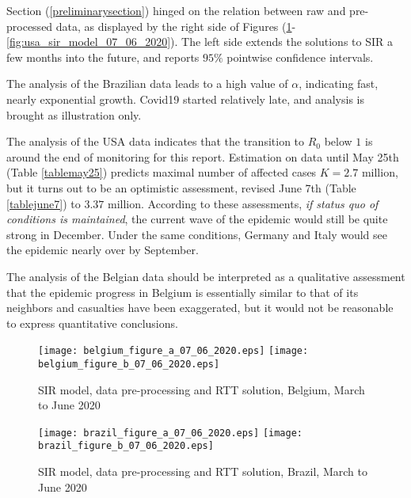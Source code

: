\documentclass{article}
\begin{document}
Section (\ref{preliminarysection}) hinged on the relation between raw and pre-processed data, as displayed by the right side of Figures  %
(\ref{fig:belgium_sir_model_07_06_2020}-\ref{fig:usa_sir_model_07_06_2020}). The left side extends the solutions to SIR a few months into the future, and reports $95\%$ pointwise confidence intervals.

The analysis of the Brazilian data leads to a high value of $\alpha$, indicating fast, nearly exponential growth. Covid19 started relatively late, and analysis is brought as illustration only.

The analysis of the USA data indicates that the transition to $R_0$ below $1$ is around the end of monitoring for this report. Estimation on data until May 25th (Table \ref{tablemay25}) predicts maximal number of affected cases $K=2.7$ million, but it turns out to be an optimistic assessment, revised June 7th (Table \ref{tablejune7}) to $3.37$ million. According to these assessments, {\em if status quo of conditions is maintained}, the current wave of the epidemic would still be quite strong in December. Under the same conditions, Germany and Italy would see the epidemic nearly over by September.

The analysis of the Belgian data should be interpreted as a qualitative assessment that the epidemic progress in Belgium is essentially similar to that of its neighbors and casualties have been exaggerated, but it would not be reasonable to express quantitative conclusions.

\begin{figure}
\begin{center}
{\texttt{[image: belgium\_figure\_a\_07\_06\_2020.eps]}}
\qquad
{\texttt{[image: belgium\_figure\_b\_07\_06\_2020.eps]}}
\end{center}
\begin{center}
\caption{SIR model, data pre-processing and RTT solution, Belgium, March to June 2020
}
\label{fig:belgium_sir_model_07_06_2020}
\end{center}
\end{figure}

\begin{figure}
\begin{center}
{\texttt{[image: brazil\_figure\_a\_07\_06\_2020.eps]}}
\qquad
{\texttt{[image: brazil\_figure\_b\_07\_06\_2020.eps]}}
\end{center}
\begin{center}
\caption{SIR model, data pre-processing and RTT solution, Brazil, March to June 2020
}
\label{fig:brazil_sir_model_07_06_2020}
\end{center}
\end{figure}
\end{document}
